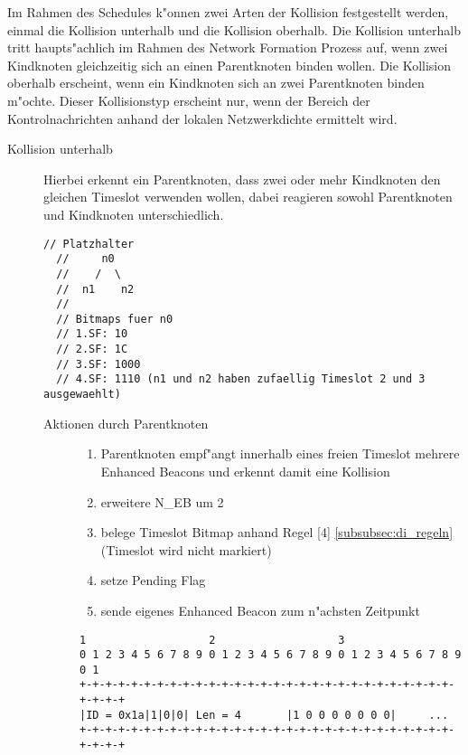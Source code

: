 Im Rahmen des Schedules k"onnen zwei Arten der Kollision festgestellt werden,
einmal die Kollision unterhalb und die Kollision oberhalb. Die Kollision unterhalb
tritt haupts"achlich im Rahmen des Network Formation Prozess auf, wenn zwei Kindknoten
gleichzeitig sich an einen Parentknoten binden wollen. Die Kollision oberhalb
erscheint, wenn ein Kindknoten sich an zwei Parentknoten binden m"ochte. Dieser
Kollisionstyp erscheint nur, wenn der Bereich der Kontrolnachrichten anhand der
lokalen Netzwerkdichte ermittelt wird.

\begin{description}

  \item [Kollision unterhalb] Hierbei erkennt ein Parentknoten, dass zwei oder
  mehr Kindknoten den gleichen Timeslot verwenden wollen, dabei reagieren sowohl
  Parentknoten und Kindknoten unterschiedlich.
  \begin{lstlisting}[frame=single]
  // Platzhalter
  //     n0
  //    /  \
  //  n1    n2
  //
  // Bitmaps fuer n0
  // 1.SF: 10
  // 2.SF: 1C
  // 3.SF: 1000
  // 4.SF: 1110 (n1 und n2 haben zufaellig Timeslot 2 und 3 ausgewaehlt)
  \end{lstlisting}
  \begin{description}
    \item [Aktionen durch Parentknoten]
    \begin{enumerate}
      \item Parentknoten empf"angt innerhalb eines freien Timeslot mehrere Enhanced Beacons
      und erkennt damit eine Kollision
      \item erweitere N\_EB um 2
      \item belege Timeslot Bitmap anhand Regel [4] \ref{subsubsec:di_regeln} (Timeslot wird nicht markiert)
      \item setze Pending Flag
      \item sende eigenes Enhanced Beacon zum n"achsten Zeitpunkt
    \end{enumerate}
\begin{lstlisting}[frame=single]
                    1                   2                   3
0 1 2 3 4 5 6 7 8 9 0 1 2 3 4 5 6 7 8 9 0 1 2 3 4 5 6 7 8 9 0 1
+-+-+-+-+-+-+-+-+-+-+-+-+-+-+-+-+-+-+-+-+-+-+-+-+-+-+-+-+-+-+-+-+
|ID = 0x1a|1|0|0| Len = 4       |1 0 0 0 0 0 0 0|     ...
+-+-+-+-+-+-+-+-+-+-+-+-+-+-+-+-+-+-+-+-+-+-+-+-+-+-+-+-+-+-+-+-+
\end{lstlisting}


\end{description}
\end{description}
